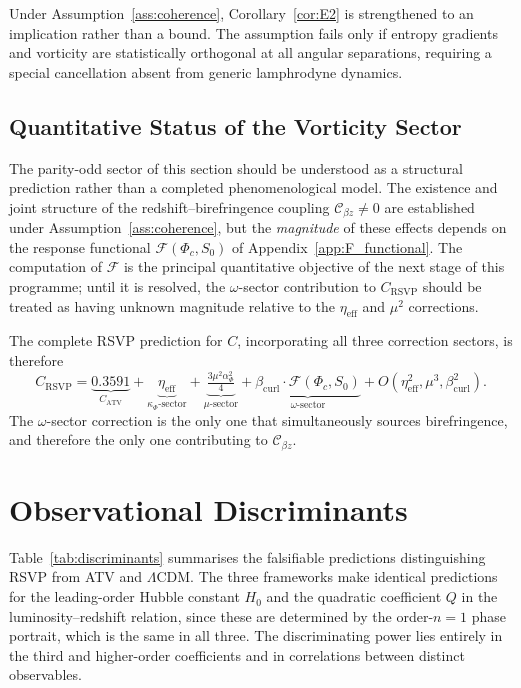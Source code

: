\documentclass[12pt,a4paper]{article}
\theoremstyle{plain}
\theoremstyle{definition}
\theoremstyle{remark}
\newcommand{\Phic}{\Phi_c}
\newcommand{\etaeff}{\eta_{\mathrm{eff}}}
\newcommand{\Cbz}{\mathcal{C}_{\beta z}}
\newcommand{\bcurl}{\beta_{\mathrm{curl}}}
\begin{document}
Under Assumption~\ref{ass:coherence}, Corollary~\ref{cor:E2} is strengthened to
an implication rather than a bound. The assumption fails only if entropy gradients
and vorticity are statistically orthogonal at all angular separations, requiring a
special cancellation absent from generic lamphrodyne dynamics.

\subsection{Quantitative Status of the Vorticity Sector}
\label{subsec:vorticity_status}

The parity-odd sector of this section should be understood as a structural
prediction rather than a completed phenomenological model. The existence and joint
structure of the redshift--birefringence coupling $\Cbz\neq 0$ are established
under Assumption~\ref{ass:coherence}, but the \emph{magnitude} of these effects
depends on the response functional $\mathcal{F}(\Phic,S_0)$ of
Appendix~\ref{app:F_functional}. The computation of $\mathcal{F}$ is the principal
quantitative objective of the next stage of this programme; until it is resolved,
the $\omega$-sector contribution to $C_{\mathrm{RSVP}}$ should be treated as
having unknown magnitude relative to the $\etaeff$ and $\mu^2$ corrections.

The complete RSVP prediction for $C$, incorporating all three correction sectors,
is therefore
\begin{equation}
  C_{\mathrm{RSVP}}
  = \underbrace{0.3591}_{C_{\mathrm{ATV}}}
    + \underbrace{\etaeff}_{\kappa_\Phi\text{-sector}}
    + \underbrace{\tfrac{3\mu^2\alpha_\Phi^2}{4}}_{\mu\text{-sector}}
    + \underbrace{\bcurl\cdot\mathcal{F}(\Phic,S_0)}_{\omega\text{-sector}}
    + O(\etaeff^2,\mu^3,\bcurl^2).
  \label{eq:C_full}
\end{equation}
The $\omega$-sector correction is the only one that simultaneously sources birefringence,
and therefore the only one contributing to $\Cbz$.

\section{Observational Discriminants}
\label{sec:disc}

Table~\ref{tab:discriminants} summarises the falsifiable predictions distinguishing
RSVP from ATV and $\Lambda$CDM. The three frameworks make identical predictions
for the leading-order Hubble constant $H_0$ and the quadratic coefficient $Q$ in
the luminosity--redshift relation, since these are determined by the order-$n=1$
phase portrait, which is the same in all three. The discriminating power lies
entirely in the third and higher-order coefficients and in correlations between
distinct observables.
\end{document}
